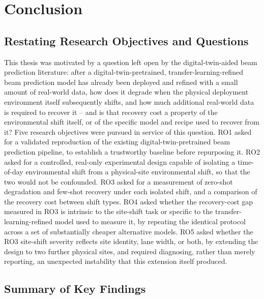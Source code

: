 \documentclass{iutbscthesis}
\begin{document}
\chapter{Conclusion}
\label{chapter:conclusion}

\section{Restating Research Objectives and Questions}

This thesis was motivated by a question left open by the digital-twin-aided beam prediction literature: after a digital-twin-pretrained, transfer-learning-refined beam prediction model has already been deployed and refined with a small amount of real-world data, how does it degrade when the physical deployment environment itself subsequently shifts, and how much additional real-world data is required to recover it -- and is that recovery cost a property of the environmental shift itself, or of the specific model and recipe used to recover from it? Five research objectives were pursued in service of this question. RO1 asked for a validated reproduction of the existing digital-twin-pretrained beam prediction pipeline, to establish a trustworthy baseline before repurposing it. RO2 asked for a controlled, real-only experimental design capable of isolating a time-of-day environmental shift from a physical-site environmental shift, so that the two would not be confounded. RO3 asked for a measurement of zero-shot degradation and few-shot recovery under each isolated shift, and a comparison of the recovery cost between shift types. RO4 asked whether the recovery-cost gap measured in RO3 is intrinsic to the site-shift task or specific to the transfer-learning-refined model used to measure it, by repeating the identical protocol across a set of substantially cheaper alternative models. RO5 asked whether the RO3 site-shift severity reflects site identity, lane width, or both, by extending the design to two further physical sites, and required diagnosing, rather than merely reporting, an unexpected instability that this extension itself produced.

\section{Summary of Key Findings}
\end{document}
